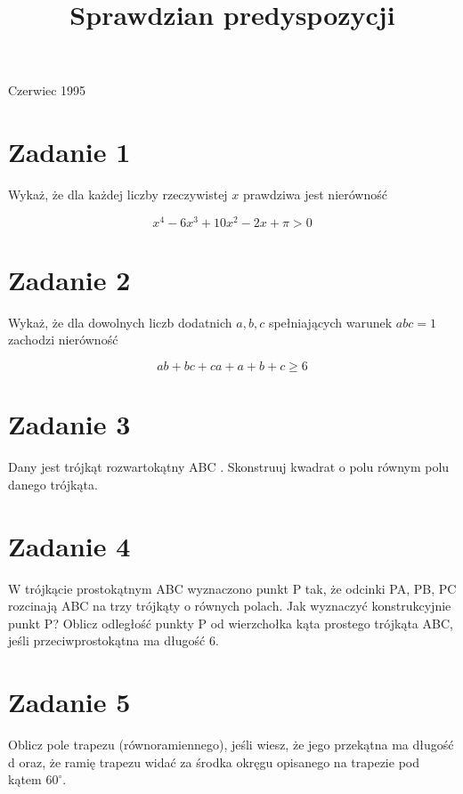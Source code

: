 \documentclass[10pt]{article}
\title{Sprawdzian predyspozycji }
\author{}
\date{}
\begin{document}
\maketitle
Czerwiec 1995

\section*{Zadanie 1}
Wykaż, że dla każdej liczby rzeczywistej \(x\) prawdziwa jest nierówność

\[
x^{4}-6 x^{3}+10 x^{2}-2 x+\pi>0
\]

\section*{Zadanie 2}
Wykaż, że dla dowolnych liczb dodatnich \(a, b, c\) spełniających warunek \(a b c=1\) zachodzi nierówność

\[
a b+b c+c a+a+b+c \geq 6
\]

\section*{Zadanie 3}
Dany jest trójkąt rozwartokątny ABC . Skonstruuj kwadrat o polu równym polu danego trójkąta.

\section*{Zadanie 4}
W trójkącie prostokątnym ABC wyznaczono punkt P tak, że odcinki PA, PB, PC rozcinają ABC na trzy trójkąty o równych polach. Jak wyznaczyć konstrukcyjnie punkt P? Oblicz odległość punkty P od wierzchołka kąta prostego trójkąta ABC, jeśli przeciwprostokątna ma długość 6.

\section*{Zadanie 5}
Oblicz pole trapezu (równoramiennego), jeśli wiesz, że jego przekątna ma długość d oraz, że ramię trapezu widać za środka okręgu opisanego na trapezie pod kątem \(60^{\circ}\).
\end{document}
